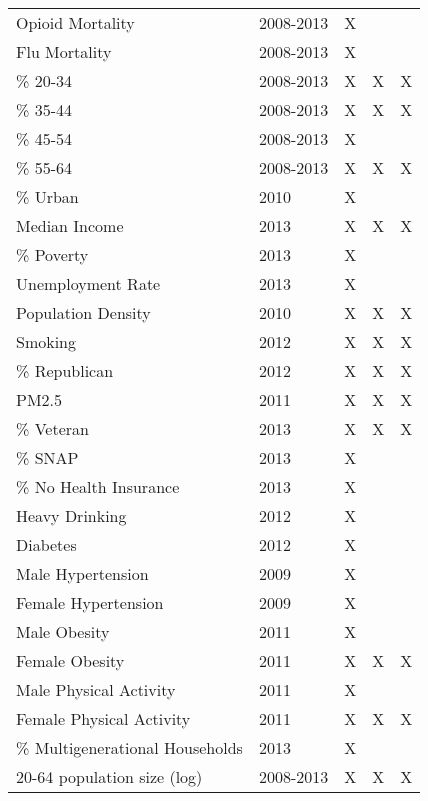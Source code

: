 \begin{table}[ht]
\begin{tabular}{lllll}
  Opioid Mortality & 2008-2013 & X &  &  \\ 
  Flu Mortality & 2008-2013 & X &  &  \\ 
  \% 20-34 & 2008-2013 & X & X & X \\ 
  \% 35-44 & 2008-2013 & X & X & X \\ 
  \% 45-54 & 2008-2013 & X &  &  \\ 
  \% 55-64 & 2008-2013 & X & X & X \\ 
  \% Urban & 2010 & X &  &  \\ 
  Median Income & 2013 & X & X & X \\ 
  \% Poverty & 2013 & X &  &  \\ 
  Unemployment Rate & 2013 & X &  &  \\ 
  Population Density & 2010 & X & X & X \\ 
  Smoking & 2012 & X & X & X \\ 
  \% Republican & 2012 & X & X & X \\ 
  PM2.5 & 2011 & X & X & X \\ 
  \% Veteran & 2013 & X & X & X \\ 
  \% SNAP & 2013 & X &  &  \\ 
  \% No Health Insurance & 2013 & X &  &  \\ 
  Heavy Drinking & 2012 & X &  &  \\ 
  Diabetes & 2012 & X &  &  \\ 
  Male Hypertension & 2009 & X &  &  \\ 
  Female Hypertension & 2009 & X &  &  \\ 
  Male Obesity & 2011 & X &  &  \\ 
  Female Obesity & 2011 & X & X & X \\ 
  Male Physical Activity & 2011 & X &  &  \\ 
  Female Physical Activity & 2011 & X & X & X \\ 
  \% Multigenerational Households & 2013 & X &  &  \\ 
  20-64 population size (log) & 2008-2013 & X & X & X \\ 
   \hline
\end{tabular}
\endgroup
\caption{} 
\end{table}
